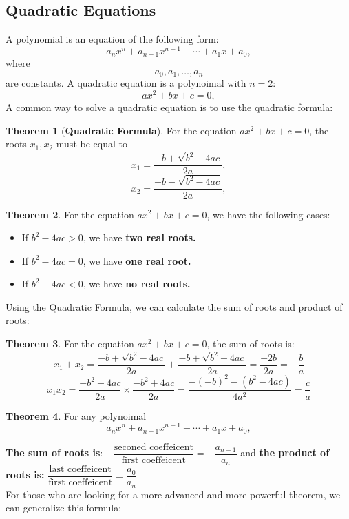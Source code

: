 \documentclass[a4paper]{article}
\theoremstyle{definition}
\newtheorem{theorem}{Theorem}
\begin{document}
\subsection{Quadratic Equations}
A polynomial is an equation of the following form:
\[
    a_n x^n + a_{n-1} x^{n-1} + \cdots + a_1 x + a_0 ,
\]
where
\[
    a_0, a_1, \dots, a_n
\]
are constants. A quadratic equation is a polynoimal with \(n = 2\):
\[
    ax^2 + bx + c = 0,
\]
A common way to solve a quadratic equation is to use the quadratic formula:
\begin{theorem}[\textbf{Quadratic Formula}]
    For the equation \(ax^2 + bx + c = 0\), the roots \(x_1, x_2 \) must be equal to
    \[
        x_1 = \dfrac{-b + \sqrt{b^2 - 4ac}}{2a},
    \]
    \[
        x_2 = \dfrac{-b - \sqrt{b^2 - 4ac}}{2a},
    \]
\end{theorem}
\begin{theorem}
    For the equation \(ax^2 + bx + c = 0\), we have the following cases:
    \begin{itemize}
        \item If \(b^2 - 4ac > 0\), we have \textbf{two real roots.}
        \item If \(b^2 - 4ac = 0\), we have \textbf{one real root.}
        \item If \(b^2 - 4ac < 0\), we have \textbf{no real roots.}
    \end{itemize}
    Using the Quadratic Formula, we can calculate the sum of roots and product of roots:
\end{theorem}
\begin{theorem}
    For the equation \(ax^2 + bx + c = 0\), the sum of roots is:
    \begin{displaymath}
        x_1 + x_2 = \dfrac{-b + \sqrt{b^2 - 4ac}}{2a} + \dfrac{-b + \sqrt{b^2 - 4ac}}{2a}
        = \dfrac{-2b}{2a} = - \dfrac{b}{a}
    \end{displaymath}
    \begin{displaymath}
        x_1x_2 = \dfrac{-b^2 + 4ac}{2a} \times \dfrac{-b^2 + 4ac}{2a} =
        \dfrac{-(-b)^2 - (b^2 - 4ac)}{4a^2} = \dfrac{c}{a}
    \end{displaymath}
\end{theorem}
\begin{theorem}
    For any polynoimal
    \[
        a_n x^n + a_{n-1} x^{n-1} + \cdots + a_1 x + a_0 ,
    \]

    \textbf{The sum of roots is}: \( - \dfrac{\text{seconed coeffeicent}}{\text{first coeffeicent}}
    = - \dfrac{a_{n-1}}{a_n}\)
    and \textbf{the product of roots is:} \(\dfrac{\text{last coeffeicent}}{\text{first coeffeicent}}
    = \dfrac{a_0}{a_n} \) \\

    \noindent
    For those who are looking for a more advanced and more powerful theorem, we can generalize
    this formula:
\end{theorem}
\end{document}
